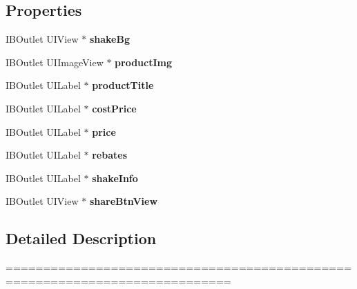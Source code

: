 \subsection*{Properties}
\begin{DoxyCompactItemize}
\item 
\mbox{\label{interface_second_shake_view_a8481e559bb120ac2b4a541dfe9a75e3d}} 
I\+B\+Outlet U\+I\+View $\ast$ {\bfseries shake\+Bg}
\item 
\mbox{\label{interface_second_shake_view_af25e1103a0e023182a800894ed88d084}} 
I\+B\+Outlet U\+I\+Image\+View $\ast$ {\bfseries product\+Img}
\item 
\mbox{\label{interface_second_shake_view_a6d3539dcb78d471d954c272ff9612826}} 
I\+B\+Outlet U\+I\+Label $\ast$ {\bfseries product\+Title}
\item 
\mbox{\label{interface_second_shake_view_a9de17ff7f026c6bccf4dfe0d84c5fc66}} 
I\+B\+Outlet U\+I\+Label $\ast$ {\bfseries cost\+Price}
\item 
\mbox{\label{interface_second_shake_view_a18d5d51a1fb4b02fc80d07aac6e1882d}} 
I\+B\+Outlet U\+I\+Label $\ast$ {\bfseries price}
\item 
\mbox{\label{interface_second_shake_view_a622783785e5f0e6c7581395d404de900}} 
I\+B\+Outlet U\+I\+Label $\ast$ {\bfseries rebates}
\item 
\mbox{\label{interface_second_shake_view_a10fb3b796956a1446562271ee21acd5a}} 
I\+B\+Outlet U\+I\+Label $\ast$ {\bfseries shake\+Info}
\item 
\mbox{\label{interface_second_shake_view_a453aaf9fc7ccb612cf37ead067de9715}} 
I\+B\+Outlet U\+I\+View $\ast$ {\bfseries share\+Btn\+View}
\end{DoxyCompactItemize}


\subsection{Detailed Description}
============================================================================

